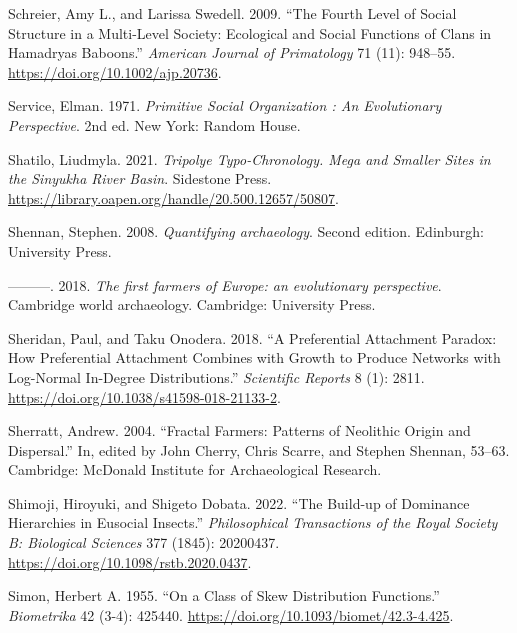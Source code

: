 \documentclass[
  12pt,
  a4paper, twoside]{book}
\newlength{\cslhangindent}
\newlength{\cslentryspacingunit} %
\newenvironment{CSLReferences}[2] %
 {%
  \setlength{\parindent}{0pt}
  \ifodd #1
  \let\oldpar\par
  \def\par{\hangindent=\cslhangindent\oldpar}
  \fi
  \setlength{\parskip}{#2\cslentryspacingunit}
 }%
 {}
\begin{document}
\begin{CSLReferences}{1}{0}
\leavevmode{}%
Schreier, Amy L., and Larissa Swedell. 2009. {``The Fourth Level of Social Structure in a Multi-Level Society: Ecological and Social Functions of Clans in Hamadryas Baboons.''} \emph{American Journal of Primatology} 71 (11): 948--55. \url{https://doi.org/10.1002/ajp.20736}.

\leavevmode{}%
Service, Elman. 1971. \emph{Primitive Social Organization : An Evolutionary Perspective}. 2nd ed. New York: Random House.

\leavevmode{}%
Shatilo, Liudmyla. 2021. \emph{Tripolye Typo-Chronology. Mega and Smaller Sites in the Sinyukha River Basin}. Sidestone Press. \url{https://library.oapen.org/handle/20.500.12657/50807}.

\leavevmode{}%
Shennan, Stephen. 2008. \emph{Quantifying archaeology}. Second edition. Edinburgh: University Press.

\leavevmode{}%
---------. 2018. \emph{The first farmers of Europe: an evolutionary perspective}. Cambridge world archaeology. Cambridge: University Press.

\leavevmode{}%
Sheridan, Paul, and Taku Onodera. 2018. {``A Preferential Attachment Paradox: How Preferential Attachment Combines with Growth to Produce Networks with Log-Normal In-Degree Distributions.''} \emph{Scientific Reports} 8 (1): 2811. \url{https://doi.org/10.1038/s41598-018-21133-2}.

\leavevmode{}%
Sherratt, Andrew. 2004. {``Fractal Farmers: Patterns of Neolithic Origin and Dispersal.''} In, edited by John Cherry, Chris Scarre, and Stephen Shennan, 53--63. Cambridge: McDonald Institute for Archaeological Research.

\leavevmode{}%
Shimoji, Hiroyuki, and Shigeto Dobata. 2022. {``The Build-up of Dominance Hierarchies in Eusocial Insects.''} \emph{Philosophical Transactions of the Royal Society B: Biological Sciences} 377 (1845): 20200437. \url{https://doi.org/10.1098/rstb.2020.0437}.

\leavevmode{}%
Simon, Herbert A. 1955. {``On a Class of Skew Distribution Functions.''} \emph{Biometrika} 42 (3-4): 425440. \url{https://doi.org/10.1093/biomet/42.3-4.425}.


\end{CSLReferences}
\end{document}
